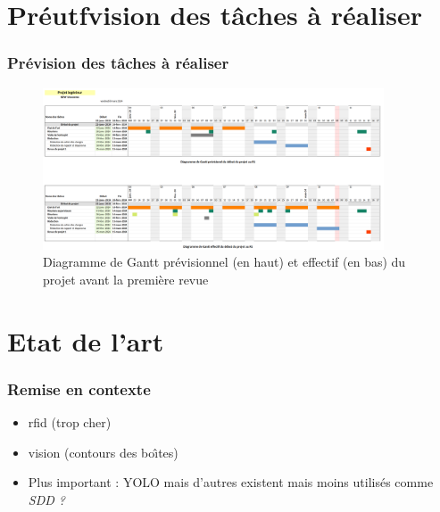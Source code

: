 \documentclass[aspectratio = 43]{beamer}
\begin{document}
\section{Pr{\'eutf}vision des t{\^a}ches {\`a} r{\'e}aliser}
\begin{frame}
  \frametitle{Pr{\'e}vision des t{\^a}ches {\`a} r{\'e}aliser}
  \begin{figure}
    \centering
    \includegraphics[scale=1,width=0.9\textwidth]{gantt_r1.png}
    \caption{Diagramme de Gantt prévisionnel (en haut) et effectif (en
      bas) du projet avant la première revue}
    \label{fig:gantt_r1}
  \end{figure}
\end{frame}
%
\section{Etat de l'art}
\begin{frame}
  \frametitle{Remise en contexte}
  \begin{itemize}
  \item rfid (trop cher)
  \item vision (contours des bo{\^\i}tes)
  \item Plus important : YOLO mais d'autres existent mais moins
    utilis{\'e}s comme \textit{SDD ?}
  \end{itemize}
\end{frame}
%
\end{document}
